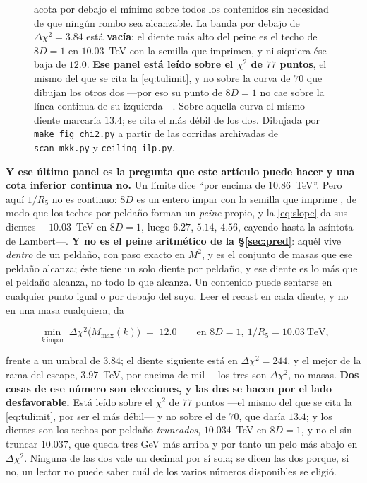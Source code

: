 \documentclass[11pt,a4paper]{article}
\newenvironment{keyeq}
  {\begin{center}\setlength{\fboxsep}{9pt}\setlength{\fboxrule}{0.8pt}%
   \begin{lrbox}{\keyeqbox}\begin{minipage}{0.88\textwidth}}
  {\end{minipage}\end{lrbox}%
   \fcolorbox{hdrblue!55}{hdrblue!6}{\usebox{\keyeqbox}}\end{center}}
\begin{document}
\begin{figure}[t]
{acota por debajo el mínimo sobre todos los contenidos sin necesidad de que ningún rombo sea
alcanzable. La banda por debajo
de $\Delta\chi^2=3.84$ está \textbf{vacía}: el diente más alto del peine es el techo de $8D=1$ en
$10.03$~TeV con la semilla que \cite{KM25} imprimen, y ni siquiera ése baja de $12.0$. \textbf{Ese panel está leído sobre el $\chi^2$ de
$77$ puntos}, el mismo del que se cita la \eqref{eq:tulimit}, y no sobre la curva de $70$ que
dibujan los otros dos ---por eso su punto de $8D=1$ no cae sobre la línea continua de su
izquierda---. Sobre aquella curva el mismo diente marcaría $13.4$; se cita el más débil de los dos.
Dibujada por
\texttt{make\_\allowbreak fig\_\allowbreak chi2.py} a partir de las corridas archivadas de
\texttt{scan\_\allowbreak mkk.py} y \texttt{ceiling\_\allowbreak ilp.py}.}\label{fig:chi2}
\end{figure}

\noindent\textbf{Y ese último panel es la pregunta que este artículo puede hacer y una cota
inferior continua no.} Un límite dice ``por encima de $10.86$~TeV''. Pero aquí $1/R_5$ no es
continuo: $8D$ es un entero impar con la semilla que imprime \cite{KM25}, de modo que los
techos por peldaño forman un \emph{peine} propio, y la
\eqref{eq:slope} da sus dientes ---$10.03$~TeV en $8D=1$, luego $6.27$, $5.14$, $4.56$, cayendo
hasta la asíntota de Lambert---. \textbf{Y no es el peine aritmético de la \S\ref{sec:pred}}:
aquél vive \emph{dentro} de un peldaño, con paso exacto en $M^2$, y es el conjunto de masas
que ese peldaño alcanza; éste tiene un solo diente por peldaño, y ese diente es lo más que el
peldaño alcanza, no todo lo que alcanza. Un contenido puede sentarse en cualquier punto igual
o por debajo del suyo. Leer el recast en cada diente, y no en una masa cualquiera, da
\begin{keyeq}
\begin{equation}\label{eq:combchi}
  \min_{k\ \mathrm{impar}}\ \Delta\chi^2\big(M_{\max}(k)\big)\;=\;12.0
  \qquad\text{en } 8D=1,\ 1/R_5=10.03\ \text{TeV,}
\end{equation}
\end{keyeq}
\noindent frente a un umbral de $3.84$; el diente siguiente está en $\Delta\chi^2=244$, y el
mejor de la rama del escape, $3.97$~TeV, por encima de mil ---los tres son $\Delta\chi^2$, no
masas. \textbf{Dos cosas de ese número son elecciones, y las
dos se hacen por el lado desfavorable.} Está leído sobre el $\chi^2$ de $77$ puntos ---el mismo
del que se cita la \eqref{eq:tulimit}, por ser el más débil--- y no sobre el de $70$, que daría
$13.4$; y los dientes son los techos por peldaño \emph{truncados}, $10.034$~TeV en $8D=1$, y no
el sin truncar $10.037$, que queda tres GeV más arriba y por tanto un pelo más abajo en
$\Delta\chi^2$. Ninguna de las dos vale un decimal por sí sola; se dicen las dos porque, si no, un
lector no puede saber cuál de los varios números disponibles se eligió.
\end{document}
